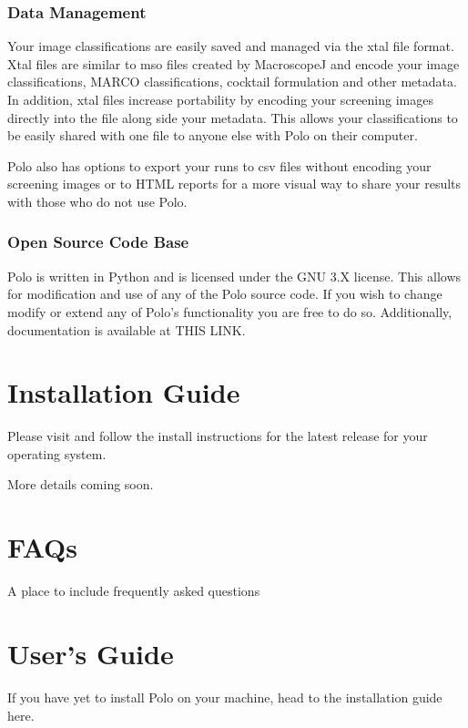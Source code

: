 \documentclass[letterpaper,10pt,english]{sphinxmanual}
\begin{document}
\subsection{Data Management}
\label{\detokenize{about:data-management}}
Your image classifications are easily saved and managed via the xtal file format. Xtal files are similar to mso files created by MacroscopeJ and encode your image classifications, MARCO classifications, cocktail formulation and other metadata. In addition, xtal files increase portability
by encoding your screening images directly into the file along side your
metadata. This allows your classifications to be easily shared with
one file to anyone else with Polo on their computer.

Polo also has options to export your runs to csv files without
encoding your screening images or to HTML reports for a more
visual way to share your results with those who do not use Polo.


\subsection{Open Source Code Base}
\label{\detokenize{about:open-source-code-base}}
Polo is written in Python and is licensed under the
GNU 3.X license. This allows for modification and use of any of the
Polo source code. If you wish to change modify or extend any of
Polo’s functionality you are free to do so. Additionally,
documentation is available at THIS LINK.


\chapter{Installation Guide}
\label{\detokenize{install:installation-guide}}\label{\detokenize{install::doc}}
Please visit 
and follow the install instructions for the latest release for your operating
system.

More details coming soon.


\chapter{FAQs}
\label{\detokenize{FAQS:faqs}}\label{\detokenize{FAQS::doc}}
A place to include frequently asked questions


\chapter{User’s Guide}
\label{\detokenize{user_guide:user-s-guide}}\label{\detokenize{user_guide::doc}}
If you have yet to install Polo on your machine, head to the installation
guide here.
\end{document}
